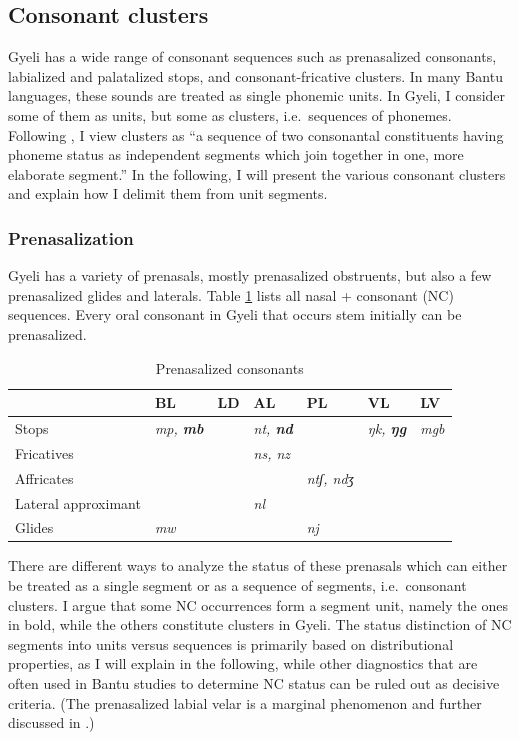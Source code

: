 \subsection{Consonant clusters}
\label{sec:CClusters}

Gyeli has a wide range of consonant sequences such as prenasalized consonants, labialized and palatalized stops, and consonant-fricative clusters. In many Bantu languages, these sounds are treated as single phonemic units. In Gyeli, I consider some of them as units, but some as clusters, i.e.\ sequences of phonemes. Following \citet[8]{guldemann2001}, I view clusters as ``a sequence of two consonantal constituents having phoneme status as independent segments which join together in one, more elaborate segment.''  In the following, I will present the various consonant clusters and explain how I delimit them from unit segments.

\subsubsection{Prenasalization}
\label{sec:Prenasa}

Gyeli has a variety of prenasals, mostly prenasalized obstruents, but also a few prenasalized glides and laterals.  Table \ref{Tab:Prenasalization} lists all nasal + consonant (NC) sequences. 
Every oral consonant in Gyeli that occurs stem initially can be prenasalized.

\begin{table} 
\centering
\begin{tabular}{l|llllll}
 \midrule
 & BL & LD & AL & PL & VL & LV \\  \midrule
Stops & {\itshape mp, {\bfseries mb}} & & {\itshape nt, {\bfseries nd}} &  & {\itshape ŋk, {\bfseries ŋg}} & {\itshape mgb} \\ 
Fricatives &  &  & {\itshape ns, nz} &  &  & \\ 
Affricates &  &  &  & {\itshape ntʃ, ndʒ} &  & \\ 
Lateral approximant & & & {\itshape nl} & & & \\
Glides & {\itshape mw} & & & {\itshape nj} & & \\
 \midrule
\end{tabular}
\caption{Prenasalized consonants}
\label{Tab:Prenasalization}
\end{table}


There are different ways to analyze the status of these prenasals which can either be treated as a single segment or as a sequence of segments, i.e.\ consonant clusters.  I argue that some NC occurrences form a segment unit, namely the ones in bold, while the others constitute clusters in Gyeli. The status distinction of NC segments into units versus sequences is primarily based on distributional properties, as I will explain in the following, while other diagnostics that are often used in Bantu studies to determine NC status can be ruled out as decisive criteria.  (The prenasalized labial velar is a marginal phenomenon and further discussed in .)

